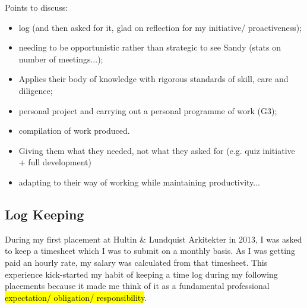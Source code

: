 Points to discuss:
\begin{itemize}
    \item log (and then asked for it, glad on reflection for my initiative/ proactiveness);
    \item needing to be opportunistic rather than strategic to see Sandy (stats on number of meetings...);
    \item Applies their body of knowledge with rigorous standards of skill, care and diligence;
    \item personal project and carrying out a personal programme of work (G3);
    \item compilation of work produced.
    \item Giving them what they needed, not what they asked for (e.g. quiz initiative + full development)
    \item adapting to their way of working while maintaining productivity...
\end{itemize}


\subsection{Log Keeping}

During my first placement at Hultin \& Lundquist Arkitekter in 2013, I was asked to keep a timesheet which I was to submit on a monthly basis.
As I was getting paid an hourly rate, my salary was calculated from that timesheet.
This experience kick-started my habit of keeping a time log during my following placements because it made me think of it as a fundamental professional \hl{expectation/ obligation/ responsibility}.

